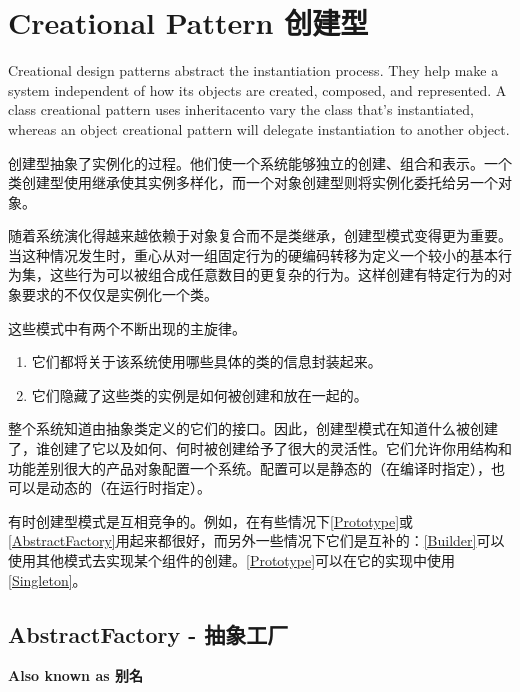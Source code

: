 \chapter{Creational Pattern 创建型}

Creational design patterns abstract the instantiation process. They help make a system independent of how its objects are created, composed, and represented. A class creational pattern uses inheritacento vary the class that's instantiated, whereas an object creational pattern will delegate instantiation to another object.

创建型抽象了实例化的过程。他们使一个系统能够独立的创建、组合和表示。一个类创建型使用继承使其实例多样化，而一个对象创建型则将实例化委托给另一个对象。

随着系统演化得越来越依赖于对象复合而不是类继承，创建型模式变得更为重要。当这种情况发生时，重心从对一组固定行为的硬编码转移为定义一个较小的基本行为集，这些行为可以被组合成任意数目的更复杂的行为。这样创建有特定行为的对象要求的不仅仅是实例化一个类。

这些模式中有两个不断出现的主旋律。

\begin{enumerate}

\item 它们都将关于该系统使用哪些具体的类的信息封装起来。

\item 它们隐藏了这些类的实例是如何被创建和放在一起的。

\end{enumerate}

整个系统知道由抽象类定义的它们的接口。因此，创建型模式在知道什么被创建了，谁创建了它以及如何、何时被创建给予了很大的灵活性。它们允许你用结构和功能差别很大的产品对象配置一个系统。配置可以是静态的（在编译时指定），也可以是动态的（在运行时指定）。

有时创建型模式是互相竞争的。例如，在有些情况下\ref{Prototype}或\ref{AbstractFactory}用起来都很好，而另外一些情况下它们是互补的：\ref{Builder}可以使用其他模式去实现某个组件的创建。\ref{Prototype}可以在它的实现中使用\ref{Singleton}。





\section{AbstractFactory - 抽象工厂}

\textbf{Also known as 别名}

